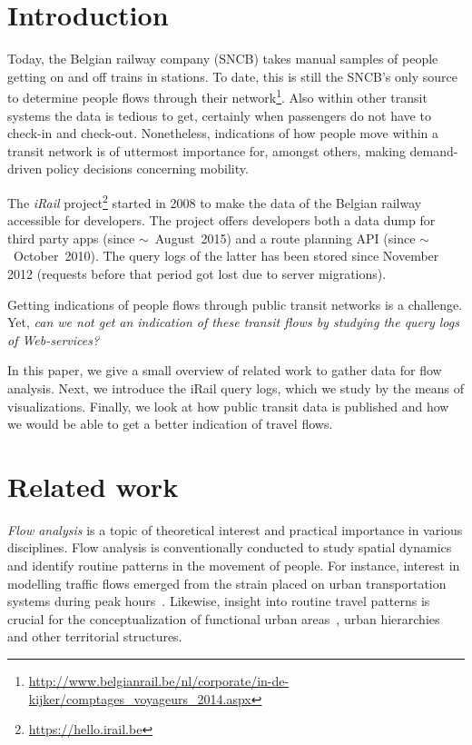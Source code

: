 \documentclass{sig-alternate}
\begin{document}
\vspace{1em}

\section{Introduction}
\label{sec:introduction}

Today, the Belgian railway company (SNCB) takes manual samples of people getting on and off trains in stations. 
To date, this is still the SNCB's only source to determine people flows through their network\footnote{\url{http://www.belgianrail.be/nl/corporate/in-de-kijker/comptages_voyageurs_2014.aspx}}.
Also within other transit systems the data is tedious to get, certainly when passengers do not have to check-in and check-out.
Nonetheless, indications of how people move within a transit network is of uttermost importance for, amongst others, making demand-driven policy decisions concerning mobility.

The \emph{iRail} project\footnote{\url{https://hello.irail.be}} started in 2008 to make the data of the Belgian railway accessible for developers.
The project offers developers both a data dump for third party apps (since $\sim$~August~2015) and a route planning API (since $\sim$~October~2010).
The query logs of the latter has been stored since November 2012 (requests before that period got lost due to server migrations).

Getting indications of people flows through public transit networks is a challenge. 
Yet, \emph{can we not get an indication of these transit flows by studying the query logs of Web-services?}

In this paper, we give a small overview of related work to gather data for flow analysis.
Next, we introduce the iRail query logs, which we study by the means of visualizations.
Finally, we look at how public transit data is published and how we would be able to get a better indication of travel flows.

\section{Related work}
\label{sec:relwork}

\emph{Flow analysis} is a topic of theoretical interest and practical importance in various disciplines. 
Flow analysis is conventionally conducted to study spatial dynamics and identify routine patterns in the movement of people.
For instance, interest in modelling traffic flows emerged from the strain placed on urban transportation systems during peak hours~\cite{roth,ferreira}.
Likewise, insight into routine travel patterns is crucial for the conceptualization of functional urban areas~\cite{servillo2013town}, urban hierarchies~\cite{christaller1966central} and other territorial structures.
\end{document}

